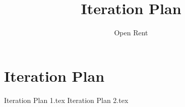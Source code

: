 \documentclass[a4paper,11pt]{book}
\title{Iteration Plan}
\author{Open Rent}
\begin{document}
\chapter{Iteration Plan}
{Iteration Plan 1.tex}
{Iteration Plan 2.tex}
\end{document}
